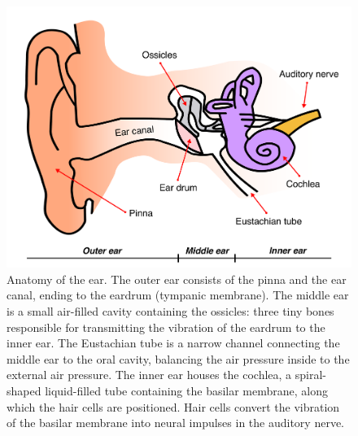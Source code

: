 \documentclass[english, 12pt, a4paper, pdftex, elec, utf8]{aaltothesis}
\begin{document}
\begin{figure}[h]
	\centering 
	\includegraphics[width=\textwidth]{ear.pdf}
	\caption{Anatomy of the ear. The outer ear consists of the pinna and the ear canal, ending to the eardrum (tympanic membrane). The middle ear is a small air-filled cavity containing the ossicles: three tiny bones responsible for transmitting the vibration of the eardrum to the inner ear. The Eustachian tube is a narrow channel connecting the middle ear to the oral cavity, balancing the air pressure inside to the external air pressure. The inner ear houses the cochlea, a spiral-shaped liquid-filled tube containing the basilar membrane, along which the hair cells are positioned. Hair cells convert the vibration of the basilar membrane into neural impulses in the auditory nerve. \cite{moore2007cochlear, pulkki2015communication}}
	\label{fig:ear} 
\end{figure} \\
\end{document}
